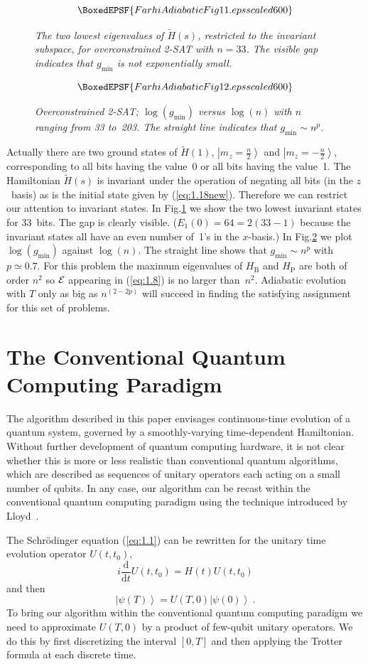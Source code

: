 \documentclass[twoside]{article}
\newcommand{\ket}[1]{\left|#1\right\rangle}
\newcommand{\numEq}[2]{\begin{equation}
   \label{eq:#1}
   #2\end{equation}}
\newcommand{\refEq}[1]{(\ref{eq:#1})}
\newcommand{\numFig}[3]{\begin{figure}[ht]
 $$\BoxedEPSF{#3}$$
    \caption{#2}\label{fig:#1}
   \end{figure}}
\newcommand{\refFig}[1]{Fig.\thinspace\ref{fig:#1}}
\newcommand{\citeRef}[1]{\thinspace\cite{ref:#1}}
\newcommand{\rd}{\mathrm{d}}
\newcommand{\rP}{{\mathrm{P}}}
\newcommand{\rB}{{\mathrm{B}}}
\newcommand{\gm}{g_{\min}}
\newcommand{\fract}[2]{{\textstyle\frac#1#2}}
\let\tilde\widetilde
\numberwithin{equation}{section}
\begin{document}
\numFig{11}{\slshape  The two lowest eigenvalues of $\tilde H(s)$,
restricted to the invariant subspace, for overconstrained 2-SAT
 with $n=33$. The visible gap indicates that $\gm$ is not exponentially
small.}{FarhiAdiabaticFig11.eps scaled 600}

\numFig{12}{\slshape  Overconstrained 2-SAT; $\log(\gm)$ versus
$\log(n)$ with $n$ ranging from 33 to~203. The straight line indicates that
$\gm \sim n^{p}$.}{FarhiAdiabaticFig12.eps scaled 600}


Actually there are two ground states of $\tilde H(1)$, $\ket{m_z=\fract
n2}$ and 
$\ket{m_z=-\fract n2}$, corresponding to all bits having the value~0 or all
bits having the value~1. The Hamiltonian $\tilde H(s)$ is invariant under
the  operation of negating all bits (in the $z$~basis) as is the initial state
given by \refEq{1.18new}. Therefore we can restrict our attention to
invariant states. In \refFig{11} we show the two lowest invariant states for
33~bits. The gap is clearly visible. ($E_1(0) = 64=2(33-1)$ because the
invariant states all have an even number of~1's in the
$x$-basis.) In
\refFig{12} we  plot $\log(\gm)$ against $\log(n)$. The straight line shows
that
$\gm\sim n^p$ with $p\simeq 0.7$. For this problem the maximum
eigenvalues of $H_\rB$ and $H_\rP$ are both of order $n^2$ so $\cal E$
appearing in
\refEq{1.8} is no larger than~$n^2$.  Adiabatic evolution with $T$ only as
big as
$n^{(2-2p)}$ will succeed in finding the  satisfying assignment for this set
of problems. 


\section{The Conventional Quantum Computing Paradigm}\label{sec:4}
The algorithm described in this paper envisages continuous-time evolution
of a quantum system, governed by a smoothly-varying time-dependent
Hamiltonian.  Without further development of quantum computing
hardware, it is not clear whether this is more or less realistic than
conventional quantum algorithms, which are described as sequences of
unitary operators each acting on a small number of qubits.  In any case, our
algorithm can be recast within the conventional quantum computing
paradigm using the technique introduced by Lloyd~\citeRef4.

The Schr\"odinger equation \refEq{1.1} can be rewritten for the unitary
time evolution operator $U(t,t_0)$,
\numEq{4.1}{ i \frac{\rd}{\rd t} U(t,t_0) = H(t) U (t,t_0) } and then
\numEq{4.2}{
\ket{\psi(T)} = U(T,0) \ket{\psi(0)} \ . } To bring our algorithm within the
conventional quantum computing paradigm we need to approximate
$U(T,0)$ by a product of few-qubit unitary operators.  We do this by first
discretizing the interval $[0,T]$ and then applying the Trotter formula at
each discrete time.
\end{document}
